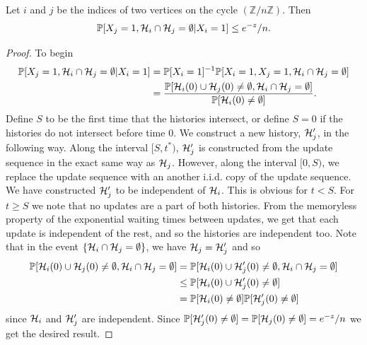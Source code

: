 	\begin{lemma}
		\label{lem:prob Xj and no intersect given Xi}
		Let $i$ and $j$ be the indices of two vertices on the cycle $(\mathbb{Z}/n\mathbb{Z})$. Then
		\begin{equation}
			\mathbb{P}[X_j = 1, \mathcal{H}_i \cap\mathcal{H}_j = \emptyset|X_i = 1] \leq e^{-z}/n.
		\end{equation}
	\end{lemma}
	\begin{proof}
		To begin
		\begin{align}
			\mathbb{P}[X_j = 1, \mathcal{H}_i \cap\mathcal{H}_j = \emptyset|X_i = 1] &= \mathbb{P}[X_i = 1]^{-1}\mathbb{P}[X_i = 1, X_j = 1, \mathcal{H}_i \cap\mathcal{H}_j = \emptyset]\\
			&= \frac{\mathbb{P}[\mathcal{H}_i(0) \cup \mathcal{H}_j(0) \neq \emptyset, \mathcal{H}_i \cap \mathcal{H}_j = \emptyset]}{\mathbb{P}[\mathcal{H}_i(0) \neq \emptyset]}.
		\end{align}
		Define $S$ to be the first time that the histories intersect, or define $S = 0$ if the histories do not intersect before time $0$. We construct a new history, $\mathcal{H}_j'$, in the following way. Along the interval $[S, t^*)$, $\mathcal{H}_j'$ is constructed from the update sequence in the exact same way as $\mathcal{H}_j$. However, along the interval $[0, S)$, we replace the update sequence with an another i.i.d. copy of the update sequence. We have constructed $\mathcal{H}_j'$ to be independent of $\mathcal{H}_i$. This is obvious for $t < S$. For $t \geq S$ we note that no updates are a part of both histories. From the memoryless property of the exponential waiting times between updates, we get that each update is independent of the rest, and so the histories are independent too. Note that in the event $\{\mathcal{H}_i \cap \mathcal{H}_j = \emptyset\}$, we have $\mathcal{H}_j = \mathcal{H}_j'$ and so
		\begin{align}
			\mathbb{P}[\mathcal{H}_i(0) \cup \mathcal{H}_j(0) \neq \emptyset, \mathcal{H}_i \cap \mathcal{H}_j = \emptyset] &= \mathbb{P}[\mathcal{H}_i(0) \cup \mathcal{H}_j'(0) \neq \emptyset, \mathcal{H}_i \cap \mathcal{H}_j = \emptyset]\\
			&\leq \mathbb{P}[\mathcal{H}_i(0) \cup \mathcal{H}_j'(0) \neq \emptyset]\\
			&= \mathbb{P}[\mathcal{H}_i(0) \neq \emptyset] \mathbb{P}[\mathcal{H}_j'(0) \neq \emptyset]
		\end{align}
		since $\mathcal{H}_i$ and $\mathcal{H}_j'$ are independent. Since $\mathbb{P}[\mathcal{H}_j'(0) \neq \emptyset] = \mathbb{P}[\mathcal{H}_j(0) \neq \emptyset] = e^{-z}/n$ we get the desired result.
	\end{proof}

